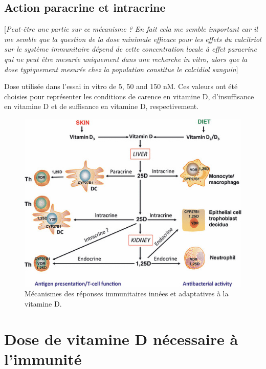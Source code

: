 \documentclass[
  a4paper,
  DIV=11,
  numbers=noendperiod,
  listof=totoc]{scrreprt}
\begin{document}
\hypertarget{action-paracrine-et-intracrine}{%
\subsection{Action paracrine et
intracrine}\label{action-paracrine-et-intracrine}}

{[}\emph{Peut-être une partie sur ce mécanisme ? En fait cela me semble
important car il me semble que la question de la dose minimale efficace
pour les effets du calcitriol sur le système immunitaire dépend de cette
concentration locale à effet paracrine qui ne peut être mesurée
uniquement dans une recherche in vitro, alors que la dose typiquement
mesurée chez la population constitue le calcidiol sanguin}{]}

Dose utilisée dans l'essai in vitro de \textcite{Hewison.2007} 5, 50 and
150 nM. Ces valeurs ont été choisies pour représenter les conditions de
carence en vitamine D, d'insuffisance en vitamine D et de suffisance en
vitamine D, respectivement.

\begin{figure}

{\centering \includegraphics{figures/meca-intracrine.jpg}

}

\caption{Mécanismes des réponses immunitaires innées et adaptatives à la
vitamine D. \textcite{Prietl.2013}}

\end{figure}

\hypertarget{dose-de-vitamine-d-nuxe9cessaire-uxe0-limmunituxe9}{%
\section{Dose de vitamine D nécessaire à
l'immunité}\label{dose-de-vitamine-d-nuxe9cessaire-uxe0-limmunituxe9}}
\end{document}
